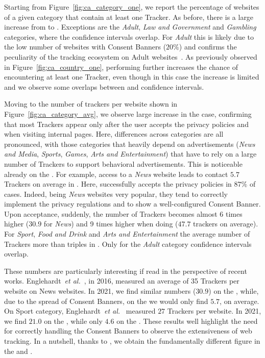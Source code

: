 Starting from Figure~\ref{fig:ca_category_one}, we report the percentage of websites of a given category that contain at least one Tracker. As before, there is a large increase from \BEFORE to \AFTER.  Exceptions are the \textit{Adult}, \textit{Law and Government} and \textit{Gambling} categories, where the confidence intervals overlap. For \textit{Adult} this is likely due to the low number of websites with Consent Banners ($20\%$) and confirms the peculiarity of the tracking ecosystem on Adult websites~\cite{vallina2019tales}. As previously observed in Figure~\ref{fig:ca_country_one}, performing \INTERNAL further increases the chance of encountering at least one Tracker, even though in this case the increase is limited and we observe some overlaps between \AFTER and \INTERNAL confidence intervals.

Moving to the number of trackers per website shown in Figure~\ref{fig:ca_category_avg}, we observe large increase in the \AFTER case, confirming that most Trackers appear only after the user accepts the privacy policies and when visiting internal pages. Here, differences across categories are all pronounced, with those categories that heavily depend on advertisements (\textit{News and Media}, \textit{Sports}, \textit{Games}, \textit{Arts and Entertainment}) that have to rely on a large number of Trackers to support behavioral advertisements. This is noticeable already on the \BEFORE. For example, access to a \textit{News} website leads to contact $5.7$ Trackers on average in \BEFORE. Here, \TOOL successfully accepts the privacy policies in $87\%$ of cases. Indeed, being \textit{News} websites very popular, they tend to correctly implement the privacy regulations and to show a well-configured Consent Banner. Upon acceptance, suddenly, the number of Trackers becomes almost 6 times higher ($30.9$ for \textit{News}) and 9 times higher when doing \INTERNAL ($47.7$ trackers on average). For \emph{Sport}, \emph{Food and Drink} and \emph{Arts and Entertainment} the average number of Trackers more than triples in \AFTER. Only for the \textit{Adult} category confidence intervals overlap.

These numbers are particularly interesting if read in the perspective of recent works. Englehardt~\emph{et al.}~\cite{englehardt2016online}, in 2016, measured an average of 35 Trackers per website on News websites. In 2021, we find similar numbers ($30.9$) on the \AFTER, while, due to the spread of Consent Banners, on the \BEFORE we would only find $5.7$, on average. On Sport category, Englehardt~\emph{et al.}~\cite{englehardt2016online} measured $27$ Trackers per website. In 2021, we find $21.0$ on the \AFTER, while only $4.6$ on the \BEFORE. These results well highlight the need for correctly handling the Consent Banners to observe the extensiveness of web tracking. %
In a nutshell, thanks to \TOOL, we obtain the fundamentally different figure in the \AFTER and \INTERNAL. 

